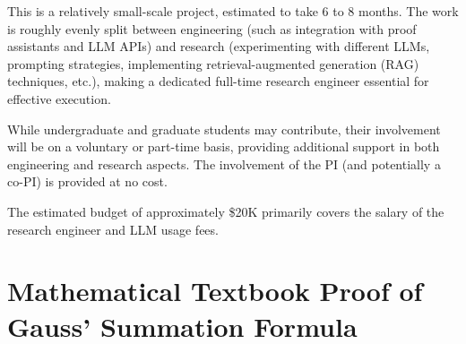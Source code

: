 \documentclass[10pt,nonacm,natbib=false]{acmart}
\begin{document}
This is a relatively small-scale project, estimated to take 6 to 8
months. The work is roughly evenly split between engineering (such as
integration with proof assistants and LLM APIs) and research
(experimenting with different LLMs, prompting strategies, implementing
retrieval-augmented generation (RAG) techniques, etc.), making a
dedicated full-time research engineer essential for effective
execution.

While undergraduate and graduate students may contribute, their
involvement will be on a voluntary or part-time basis, providing
additional support in both engineering and research aspects. The
involvement of the PI (and potentially a co-PI) is provided at no
cost.

The estimated budget of approximately \$20K primarily covers the
salary of the research engineer and LLM usage fees.

\appendix

\newpage
\section{Mathematical Textbook Proof of Gauss' Summation Formula}

\label{sec:textbookproof}
\end{document}
